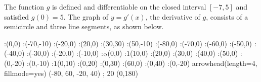 



\question The function $g$ is defined and differentiable on the closed interval $[-7,5]$ and satisfied
$g(0) = 5$. The graph of $y=g'(x)$, the derivative of $g$, consists of a semicircle and three line
segments, as shown below.

  \vspace{1cm}
      :(0,0)
      :(-70,-10)
      :(-20,0)
      :(20,0)
      :(30,30)
      :(50,-10)
      \def\Xmax{60}
      \def\Ymax{40}
      \def\Xmin{-80}
      \def\Ymin{-20}
      :$ $(-80,0)
      :$ $(-70,0)
      :$ $(-60,0)
      :$ $(-50,0)
      :$ $(-40,0)
      :$ $(-30,0)
      :$ $(-20,0)
      :$ $(-10,0)
      :$\tiny\text{O}$(0,0)
      :$1$(10,0)
      :$ $(20,0)
      :$ $(30,0)
      :$ $(40,0)
      :$ $(50,0)
      :$ $(0,-20)
      :$ $(0,-10)
      :$1$(0,10)
      :$ $(0,20)
      :$ $(0,30)
      :(\Xmax,0)
      :(0,\Ymax)
      :(0,\Ymin)
    \figdrawbegin{}
      \figset arrowhead(length=4, fillmode=yes)
      (\Xmin, \Xmax, \Ymin, \Ymax)
      \figdrawline [20,30]
       ; 20 (0,180)
      \figdrawline [40,50]
      \figdrawline [50,60]
    \figdrawend
    \centerline{\box\figBoxA}

